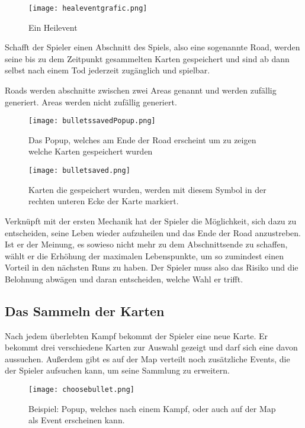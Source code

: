\begin{figure}[H]
\texttt{[image: healeventgrafic.png]}
\caption{Ein Heilevent}
\end{figure}


Schafft der Spieler einen Abschnitt des Spiels, also eine sogenannte Road, werden seine bis zu dem Zeitpunkt gesammelten Karten
gespeichert und sind ab dann selbst nach einem Tod jederzeit zugänglich und spielbar.

Roads werden abschnitte zwischen zwei Areas genannt und werden zufällig generiert. Areas werden nicht zufällig generiert.

\begin{figure}[H]
    \texttt{[image: bulletssavedPopup.png]}
    \caption{Das Popup, welches am Ende der Road erscheint um zu zeigen welche Karten gespeichert wurden}
\end{figure}


\begin{figure}[H]
    \texttt{[image: bulletsaved.png]}
    \caption{Karten die gespeichert wurden, werden mit diesem Symbol in der rechten unteren Ecke der Karte markiert.}
\end{figure}

Verknüpft mit der ersten Mechanik
hat der Spieler die Möglichkeit, sich dazu zu entscheiden, seine Leben wieder aufzuheilen und das Ende der Road anzustreben.
Ist er der Meinung, es sowieso nicht mehr zu dem Abschnittsende zu schaffen, wählt er die Erhöhung der maximalen
Lebenspunkte, um so zumindest einen Vorteil in den nächsten Runs zu haben. Der Spieler muss also das Risiko und die
Belohnung abwägen und daran entscheiden, welche Wahl er trifft.



\subsection{Das Sammeln der Karten}\label{sammeln_der_Karten}

Nach jedem überlebten Kampf bekommt der Spieler eine neue Karte. Er bekommt drei verschiedene Karten zur Auswahl gezeigt und darf sich eine davon aussuchen.
Außerdem gibt es auf der Map verteilt noch zusätzliche Events, die der Spieler aufsuchen kann, um seine Sammlung zu erweitern.

\begin{figure}[H]
    \texttt{[image: choosebullet.png]}
    \caption{Beispiel: Popup, welches nach einem Kampf, oder auch auf der Map als Event erscheinen kann.}
\end{figure}

